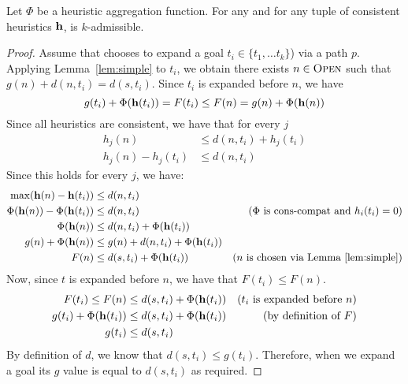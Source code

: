 \begin{theorem}
  \label{thm:consistent}
  Let $\Phi$ be a \axiomcons heuristic aggregation function.
  For any \kgs and for any tuple of consistent heuristics $\mathbf{h}$, \kastarphi is $k$-admissible.
\end{theorem}
\begin{proof}
  Assume that \kastar chooses to expand a goal $t_i \in \{t_1, \ldots t_k\}$) via a path $p$. 
  Applying Lemma~\ref{lem:simple} to $t_i$, we obtain there exists $n\in \textsc{Open}$ such that $g(n) + d(n, t_i) = d(s, t_i)$.
  Since $t_i$ is expanded before $n$, we have 
  \begin{equation}
      g(t_i) + \Phi(\mathbf{h}(t_i)) = F(t_i) \leq F(n) = g(n) + \Phi(\mathbf{h}(n))
  \end{equation}
    Since all heuristics are consistent, we have that for every $j$
  \begin{align}
    h_j(n)                  & \leq d(n, t_i) + h_j(t_i)   \\
    h_j(n) - h_j(t_i)       & \leq d(n, t_i)               
\end{align}
Since this holds for every $j$, we have: 
\begin{align}
    \max (\vect{h}(n) - \vect{h}(t_i)) & \leq d(n, t_i)              & \text{}\\
    \Phi(\vect{h}(n))-\Phi(\vect{h}(t_i))  & \leq d(n, t_i)  & \text{($\Phi$ is \axiomcons and $h_i(t_i) = 0$)}\\
        \Phi(\vect{h}(n))  & \leq d(n, t_i) + \Phi(\vect{h}(t_i)) & \\
    g(n) + \Phi(\vect{h}(n))           & \leq g(n)+ d(n, t_i) + \Phi(\vect{h}(t_i)) & \\
    F(n)           & \leq d(s, t_i) + \Phi(\vect{h}(t_i)) &
    \text{($n$ is chosen via Lemma~\ref{lem:simple})}
  \end{align}  
    Now, since $t$ is expanded before $n$, we have that $F(t_i) \leq F(n)$. 
  \begin{align}  
    F(t_i) \leq F(n)                     & \leq d(s, t_i) + \Phi(\mathbf{h}(t_i)) & \text{($t_i$ is expanded before $n$)}\\
    g(t_i) + \Phi(\mathbf{h}(t_i))           & \leq d(s, t_i) + \Phi(\mathbf{h}(t_i)) & \text{(by definition of $F$)}\\
    g(t_i)                & \leq d(s, t_i) & 
    \label{eq:consistent}
  \end{align}
  By definition of $d$, we know that $d(s,t_i)\leq g(t_i)$. Therefore, when we expand a goal its $g$ value is equal to $d(s, t_i)$ as required.
\end{proof}


